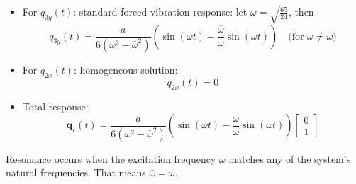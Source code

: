 \documentclass[12pt]{article}
\begin{document}
\begin{itemize}
	\item For \( q_{3y}(t) \): standard forced vibration response: let $\omega=\sqrt{\frac{65}{24}}$, then
	      \[
		      q_{3y}(t) = \frac{a}{6(\omega^2 - \bar{\omega}^2)}
		      \left( \sin(\bar{\omega} t) - \frac{\bar{\omega}}{\omega} \sin(\omega t) \right)
		      \quad \text{(for } \omega \neq \bar{\omega})
	      \]
	\item For \( q_{2x}(t) \): homogeneous solution:
	      \[
		      q_{2x}(t) = 0
	      \]
	\item Total response:
	      \[
		      \mathbf{q}_r(t) = \frac{a}{6(\omega^2 - \bar{\omega}^2)}
		      \left( \sin(\bar{\omega} t) - \frac{\bar{\omega}}{\omega} \sin(\omega t) \right)
		      \begin{bmatrix} 0 \\ 1 \end{bmatrix}
	      \]
\end{itemize}
Resonance occurs when the excitation frequency \( \bar{\omega} \) matches any of the system's natural frequencies. That means $\bar{\omega} = \omega$.
\end{document}
